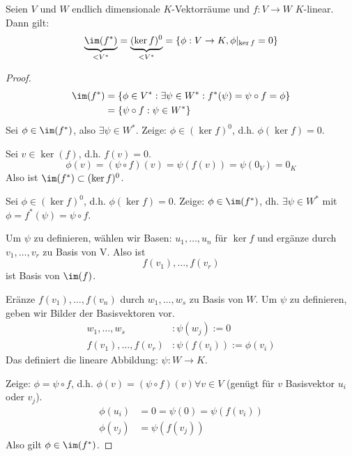 \documentclass{mycourse}
\begin{document}
\begin{prop}
\label{prop:9.13}
Seien $V$ und $W$ endlich dimensionale $K$-Vektorräume und $f:V\to W$ $K$-linear.
Dann gilt:
\[
\underbrace{\im(f^*)}_{< V^*}=\underbrace{(\ker f)^0}_{<V^*} =\{\phi:V\to K, \phi|_{\ker f}=0\}
\]
\begin{proof}
\begin{align*}
\im(f^*) &=\{\phi\in V^*:\exists \psi\in W^*:f^*(\psi)=\psi\circ f=\phi\}\\
&=\{\psi\circ f:\psi\in W^*\}
\end{align*}
Sei $\phi\in\im(f^*)$, also $\exists \psi\in W^*$.
Zeige: $\phi\in(\ker f)^0$, d.h. $\phi(\ker f)=0$.

Sei $v\in \ker(f)$, d.h. $f(v)=0$.
\[
\phi(v)=(\psi\circ f)(v)=\psi(f(v))=\psi(0_V)=0_K
\]
Also ist $\im(f^*)\subset (\ker f)^0$.

Sei $\phi\in (\ker f)^0$, d.h. $\phi(\ker f)=0$.
Zeige: $\phi\in\im(f^*)$, dh. $\exists\psi\in W^*$ mit $\phi=f^*(\psi)=\psi\circ f$.

\begin{center}
      \end{center}

Um $\psi$ zu definieren, wählen wir Basen: $u_1,\dotsc,u_n$ für $\ker f$ und ergänze durch $v_1,\dotsc,v_r$ zu Basis von V.
Also ist
\[
f(v_1),\dotsc,f(v_r)
\]
ist Basis von $\im(f)$.

Eränze $f(v_1),\dotsc,f(v_n)$ durch $w_1,\dotsc,w_s$ zu Basis von $W$.
Um $\psi$ zu definieren, geben wir Bilder der Basisvektoren vor.
\begin{align*}
w_1,\dotsc,w_s&:\psi(w_j):=0 \\
f(v_1),\dotsc,f(v_r)&:\psi(f(v_i)):=\phi(v_i)
\end{align*}
Das definiert die lineare Abbildung: $\psi: W\to K$.

Zeige: $\phi=\psi\circ f$, d.h. $\phi(v)=(\psi\circ f)(v)\forall v\in V$ (genügt für $v$ Basisvektor $u_i$ oder $v_j$).
\begin{align*}
\phi(u_i)&=0= \psi(0)=\psi(f(v_i))\\
\phi(v_j)&=\psi(f(v_j))
\end{align*}
Also gilt $\phi\in \im(f^*)$.
\end{proof}
\end{prop}
\end{document}
